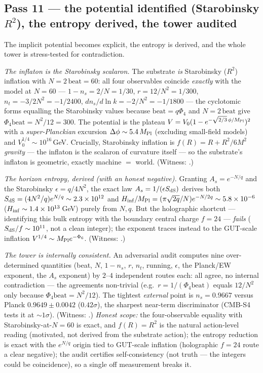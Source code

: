 \documentclass[11pt]{article}
\begin{document}
\subsection{Pass 11 --- the potential identified (Starobinsky $R^2$), the entropy derived, the tower audited}
\label{sec:capstone-eleven}

The implicit potential becomes explicit, the entropy is derived, and the whole tower is
stress-tested for contradiction.

\emph{The inflaton is the Starobinsky scalaron.} The substrate \emph{is} Starobinsky
($R^2$) inflation with $N=2\,\mathrm{beat}=60$: all four observables coincide \emph{exactly}
with the model at $N=60$ --- $1-n_s=2/N=1/30$, $r=12/N^2=1/300$, $n_t=-3/2N^2=-1/2400$,
$dn_s/d\ln k=-2/N^2=-1/1800$ --- the cyclotomic forms equalling the Starobinsky values
because $\mathrm{beat}=q\Phi_4$ and $N=2\,\mathrm{beat}$ give $\Phi_4\mathrm{beat}=N^2/12=300$.
The potential is the plateau $V=V_0(1-e^{-\sqrt{2/3}\,\phi/M_{\rm Pl}})^2$ with a
\emph{super-Planckian} excursion $\Delta\phi\sim5.4\,M_{\rm Pl}$ (excluding small-field
models) and $V_0^{1/4}\sim10^{16}$\,GeV. Crucially, Starobinsky inflation is $f(R)=R+R^2/6M^2$
\emph{gravity} --- the inflaton is the scalaron of curvature itself --- so the substrate's
inflaton is geometric, exactly machine $=$ world. (Witness: .)

\emph{The horizon entropy, derived (with an honest negative).} Granting $A_s=e^{-N/q}$ and
the Starobinsky $\epsilon=q/4N^2$, the exact law $A_s=1/(\epsilon S_{\rm dS})$ derives both
$S_{\rm dS}=(4N^2/q)e^{N/q}\sim2.3\times10^{12}$ and $H_{\rm inf}/M_{\rm Pl}=(\pi\sqrt{2q}/N)
e^{-N/2q}\sim5.8\times10^{-6}$ ($H_{\rm inf}\sim1.4\times10^{13}$\,GeV) purely from $N,q$.
But the holographic shortcut --- identifying this bulk entropy with the boundary central
charge $f=24$ --- \emph{fails} ($S_{\rm dS}/f\sim10^{11}$, not a clean integer); the
exponent traces instead to the GUT-scale inflation $V^{1/4}\sim M_{\rm Pl}e^{-\Phi_6}$.
(Witness: .)

\emph{The tower is internally consistent.} An adversarial audit computes nine
over-determined quantities (beat, $N$, $1-n_s$, $r$, $n_t$, running, $\epsilon$, the
Planck/EW exponent, the $A_s$ exponent) by $2$--$4$ independent routes each: all agree, no
internal contradiction --- the agreements non-trivial (e.g.\ $r=1/(\Phi_4\mathrm{beat})$
equals $12/N^2$ only because $\Phi_4\mathrm{beat}=N^2/12$). The tightest \emph{external}
point is $n_s=0.9667$ versus Planck $0.9649\pm0.0042$ ($0.42\sigma$), the sharpest
near-term discriminator (CMB-S4 tests it at $\sim1\sigma$). (Witness:
.) \emph{Honest scope:} the four-observable equality
with Starobinsky-at-$N=60$ is exact, and $f(R)=R^2$ is the natural action-level reading
(motivated, not derived from the substrate action); the entropy reduction is exact with the
$e^{N/q}$ origin tied to GUT-scale inflation (holographic $f=24$ route a clear negative);
the audit certifies self-consistency (not truth --- the integers could be coincidence), so a
single off measurement breaks it.
\end{document}
